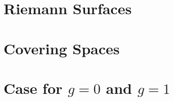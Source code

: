 \documentclass[a4paper, 8pt, notitlepage]{extreport}
\begin{document}
    

    \chapter{Riemann Surfaces}
    
    

    \chapter{Covering Spaces}\label{cpt:covering_spaces}
    
    

    \chapter{Case for $g=0$ and $g=1$}
    
    
    \printbibliography
\end{document}
